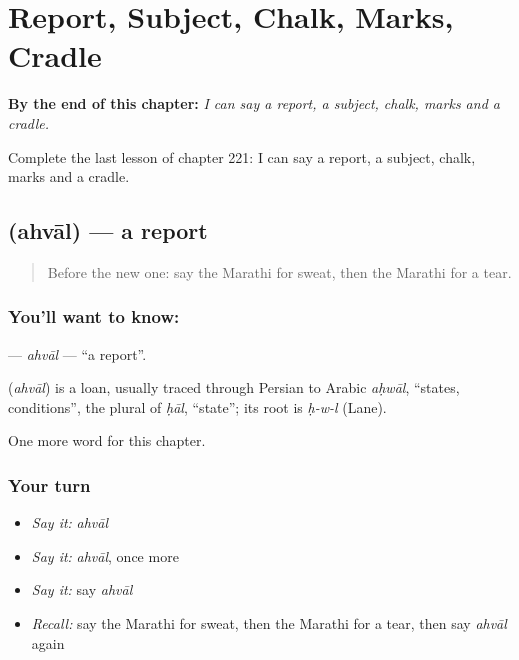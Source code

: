 
\chapter{Report, Subject, Chalk, Marks, Cradle}
\label{ch:mr-report-subject-chalk-marks-cradle}

\begin{chapteropening}
\textbf{By the end of this chapter:} \emph{I can say a report, a subject, chalk, marks and a cradle.}

Complete the last lesson of chapter 221: I can say a report, a subject, chalk, marks and a cradle.
\end{chapteropening}

\section[\texorpdfstring{\mr{अहवाल} (ahvāl)}{अहवाल (ahvāl)}]{ (ahvāl) — a report}

\label{lesson:MR-C221-ahval}



\begin{quote}
Before the new one: say the Marathi for sweat, then the Marathi for a tear.
\end{quote}

\subsection*{You'll want to know: }
\textbf{} — \emph{ahvāl} — \textquotedblleft{}a report\textquotedblright{}.

\begin{cousinweb}
\textbf{} (\emph{ahvāl}) is a loan, usually traced through Persian to Arabic \emph{aḥwāl}, \textquotedblleft{}states, conditions\textquotedblright{}, the plural of \emph{ḥāl}, \textquotedblleft{}state\textquotedblright{}; its root is \emph{ḥ-w-l} (Lane).
\end{cousinweb}

\begin{grammarlens}[title={What you've built}]
One more word for this chapter.
\end{grammarlens}

\subsection*{Your turn}
\begin{itemize}
\raggedright
  \item \emph{Say it:} \emph{ahvāl}
  \item \emph{Say it:} \emph{ahvāl}, once more
  \item \emph{Say it:} say \emph{ahvāl}
  \item \emph{Recall:} say the Marathi for sweat, then the Marathi for a tear, then say \emph{ahvāl} again
\end{itemize}

